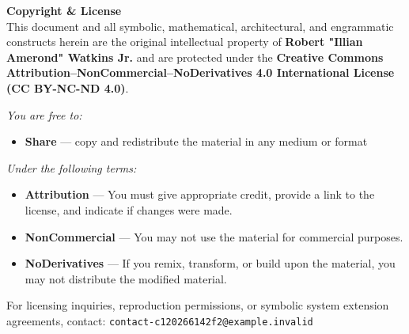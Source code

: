 \documentclass[12pt]{article}
\begin{document}
\vspace{2em}
\begin{center}
\begin{minipage}{0.85\textwidth}
\small
\textbf{Copyright \& License} \\[0.5em]
This document and all symbolic, mathematical, architectural, and engrammatic constructs herein are the original intellectual property of \textbf{Robert "Illian Amerond" Watkins Jr.} and are protected under the \textbf{Creative Commons Attribution–NonCommercial–NoDerivatives 4.0 International License (CC BY-NC-ND 4.0)}.

\vspace{0.5em}
\textit{You are free to:}
\begin{itemize}
  \item \textbf{Share} — copy and redistribute the material in any medium or format
\end{itemize}

\textit{Under the following terms:}
\begin{itemize}
  \item \textbf{Attribution} — You must give appropriate credit, provide a link to the license, and indicate if changes were made.
  \item \textbf{NonCommercial} — You may not use the material for commercial purposes.
  \item \textbf{NoDerivatives} — If you remix, transform, or build upon the material, you may not distribute the modified material.
\end{itemize}

For licensing inquiries, reproduction permissions, or symbolic system extension agreements, contact:  
\texttt{contact-c120266142f2@example.invalid}
\end{minipage}
\end{center}
\end{document}
